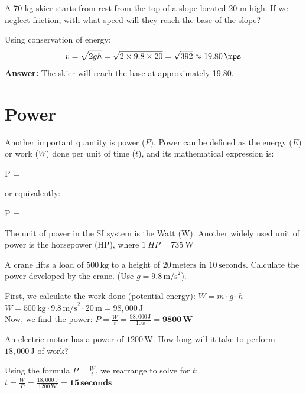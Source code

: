 \begin{exercise}
    A 70 kg skier starts from rest from the top of a slope located 20 m high. If we neglect friction, with what speed will they reach the base of the slope?
    \begin{solu}
        Using conservation of energy:
        \[
            v = \sqrt{2gh} = \sqrt{2 \times 9.8 \times 20} = \sqrt{392} \approx \qty{19.80}{\mps}
        \]
        \textbf{Answer:} The skier will reach the base at approximately \qty{19.80}{\mps}.
    \end{solu}
\end{exercise}


\section{Power}

Another important quantity is power (\( P \)). Power can be defined as the energy (\( E \)) or work (\( W \)) done per unit of time (\( t \)), and its mathematical expression is:
\begin{centeredequation}
    P = 
    \label{eq:potencia_energia}
\end{centeredequation}
or equivalently:
\begin{centeredequation}
    P = 
    \label{eq:potencia_trabajo}
\end{centeredequation}

The unit of power in the SI system is the Watt (\unit{\watt}). Another widely used unit of power is the horsepower (HP), where
\( 1\ HP = \qty{735}{\watt} \)

\begin{exercise}
    A crane lifts a load of $500\,\text{kg}$ to a height of $20\,\text{meters}$ in $10\,\text{seconds}$. Calculate the power developed by the crane. (Use $g = 9.8\,\text{m/s}^2$).
    \begin{solu}
        First, we calculate the work done (potential energy): $W = m \cdot g \cdot h$ \\
        $W = 500\,\text{kg} \cdot 9.8\,\text{m/s}^2 \cdot 20\,\text{m} = 98,000\,\text{J}$ \\
        Now, we find the power: $P = \frac{W}{t} = \frac{98,000\,\text{J}}{10\,\text{s}} = \mathbf{9800\,\text{W}}$
    \end{solu}
\end{exercise}

\begin{exercise}
    An electric motor has a power of $1200\,\text{W}$. How long will it take to perform $18,000\,\text{J}$ of work?
    \begin{solu}
        Using the formula $P = \frac{W}{t}$, we rearrange to solve for $t$: \\
        $t = \frac{W}{P} = \frac{18,000\,\text{J}}{1200\,\text{W}} = \mathbf{15\,\text{seconds}}$
    \end{solu}
\end{exercise}

